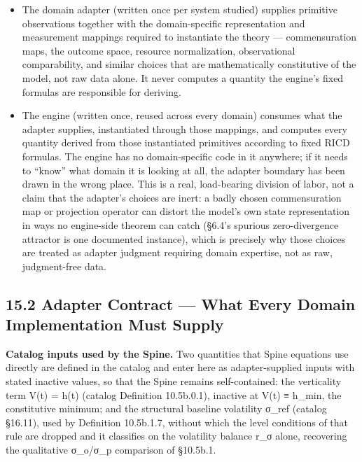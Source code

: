 \documentclass[
]{article}
\begin{document}
\begin{itemize}
\item
  The domain adapter (written once per system studied) supplies
  primitive observations together with the domain-specific
  representation and measurement mappings required to instantiate the
  theory --- commensuration maps, the outcome space, resource
  normalization, observational comparability, and similar choices that
  are mathematically constitutive of the model, not raw data alone. It
  never computes a quantity the engine's fixed formulas are responsible
  for deriving.
\item
  The engine (written once, reused across every domain) consumes what
  the adapter supplies, instantiated through those mappings, and
  computes every quantity derived from those instantiated primitives
  according to fixed RICD formulas. The engine has no domain-specific
  code in it anywhere; if it needs to ``know'' what domain it is looking
  at all, the adapter boundary has been drawn in the wrong place. This
  is a real, load-bearing division of labor, not a claim that the
  adapter's choices are inert: a badly chosen commensuration map or
  projection operator can distort the model's own state representation
  in ways no engine-side theorem can catch (§6.4's spurious
  zero-divergence attractor is one documented instance), which is
  precisely why those choices are treated as adapter judgment requiring
  domain expertise, not as raw, judgment-free data.
\end{itemize}

\hypertarget{adapter-contract-what-every-domain-implementation-must-supply}{%
\subsection{15.2 Adapter Contract --- What Every Domain Implementation
Must
Supply}\label{adapter-contract-what-every-domain-implementation-must-supply}}

\textbf{Catalog inputs used by the Spine.} Two quantities that Spine
equations use directly are defined in the catalog and enter here as
adapter-supplied inputs with stated inactive values, so that the Spine
remains self-contained: the verticality term V(t) = h(t) (catalog
Definition 10.5b.0.1), inactive at V(t) ≡ h\_min, the constitutive
minimum; and the structural baseline volatility σ\_ref (catalog §16.11),
used by Definition 10.5b.1.7, without which the level conditions of that
rule are dropped and it classifies on the volatility balance r\_σ alone,
recovering the qualitative σ\_o/σ\_p comparison of §10.5b.1.
\end{document}
